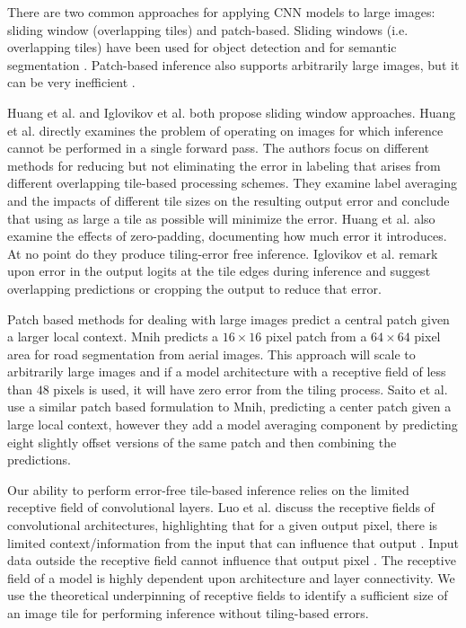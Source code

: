 \documentclass[10pt, indentfirst]{article}
\begin{document}
There are two common approaches for applying CNN models to large images: sliding window (overlapping tiles) and patch-based.
Sliding windows (i.e. overlapping tiles) have been used for object detection \citep{Sermanet2013,VanEtten2019} and for semantic segmentation \citep{Lin2019,Volpi2017a}.
Patch-based inference also supports arbitrarily large images, but it can be very inefficient \citep{Volpi2017a,Maggiori2016}.

Huang et al. and Iglovikov et al. \citep{Huang2019a,Iglovikov2017} both propose sliding window approaches.
Huang et al. \citep{Huang2019a} directly examines the problem of operating on images for which inference cannot be performed in a single forward pass.
The authors focus on different methods for reducing but not eliminating the error in labeling that arises from different overlapping tile-based processing schemes.
They examine label averaging and the impacts of different tile sizes on the resulting output error and conclude that using as large a tile as possible will minimize the error.
Huang et al. \citep{Huang2019a} also examine the effects of zero-padding, documenting how much error it introduces.
At no point do they produce tiling-error free inference.
Iglovikov et al. \citep{Iglovikov2017} remark upon error in the output logits at the tile edges during inference and suggest overlapping predictions or cropping the output to reduce that error.

Patch based methods for dealing with large images predict a central patch given a larger local context.
Mnih \citep{Mnih2013} predicts a $16 \times 16$ pixel patch from a $64 \times 64$ pixel area for road segmentation from aerial images.
This approach will scale to arbitrarily large images and if a model architecture with a receptive field of less than $48$ pixels is used, it will have zero error from the tiling process.
Saito et al. \citep{Saito2016} use a similar patch based formulation to Mnih, predicting a center patch given a large local context, however they add a model averaging component by predicting eight slightly offset versions of the same patch and then combining the predictions.

Our ability to perform error-free tile-based inference relies on the limited receptive field of convolutional layers.
Luo et al. \citep{Luo2016} discuss the receptive fields of convolutional architectures, highlighting that for a given output pixel, there is limited context/information from the input that can influence that output \citep{araujo2019computing}.
Input data outside the receptive field cannot influence that output pixel \citep{Luo2016}.
The receptive field of a model is highly dependent upon architecture and layer connectivity.
We use the theoretical underpinning of receptive fields to identify a sufficient size of an image tile for performing inference without tiling-based errors.
\end{document}
